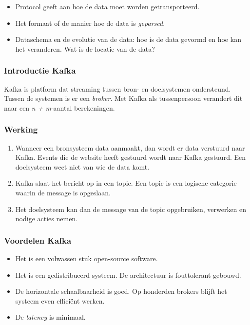 \documentclass[a4paper,10pt,twoside]{report}
\begin{document}
\begin{itemize}
	\item Protocol geeft aan hoe de data moet worden getransporteerd.
	\item Het formaat of de manier hoe de data is \textit{geparsed}.
	\item Dataschema en de evolutie van de data: hoe is de data gevormd en hoe kan het veranderen. Wat is de locatie van de data?
\end{itemize}

\subsubsection{Introductie Kafka}

Kafka is platform dat streaming tussen bron- en doelsystemen ondersteund. Tussen de systemen is er een \textit{broker}. Met Kafka als tussenpersoon verandert dit naar een \textit{n + m}-aantal berekeningen.

\subsubsection{Werking}

\begin{enumerate}
	\item Wanneer een bronsysteem data aanmaakt, dan wordt er data verstuurd naar Kafka. Events die de website heeft gestuurd wordt naar Kafka gestuurd. Een doelsysteem weet niet van wie de data komt.
	\item Kafka slaat het bericht op in een topic. Een topic is een logische categorie waarin de message is opgeslaan. 
	\item Het doelsysteem kan dan de message van de topic opgebruiken, verwerken en nodige acties nemen.
\end{enumerate}

\subsubsection{Voordelen Kafka}

\begin{itemize}
	\item Het is een volwassen stuk open-source software.
	\item Het is een gedistribueerd systeem. De architectuur is fouttolerant gebouwd.
	\item De horizontale schaalbaarheid is goed. Op honderden brokers blijft het systeem even efficiënt werken.
	\item De \textit{latency} is minimaal. 
\end{itemize}
\end{document}
